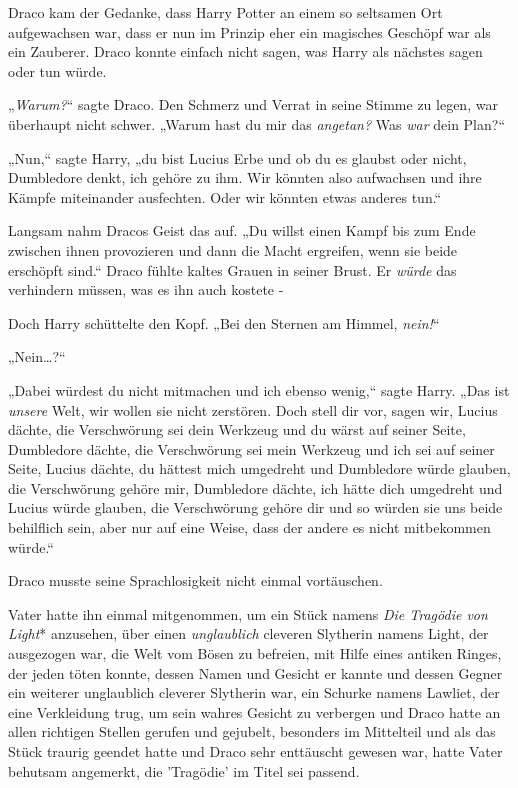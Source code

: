 {Draco kam der Gedanke, dass Harry Potter an einem so seltsamen Ort aufgewachsen war, dass er nun im Prinzip eher ein magisches Geschöpf war als ein Zauberer. Draco konnte einfach nicht sagen, was Harry als nächstes sagen oder tun würde.

„\emph{Warum?}“ sagte Draco. Den Schmerz und Verrat in seine Stimme zu legen, war überhaupt nicht schwer. „Warum hast du mir das \emph{angetan?} Was \emph{war} dein Plan?“

„Nun,“ sagte Harry, „du bist Lucius Erbe und ob du es glaubst oder nicht, Dumbledore denkt, ich gehöre zu ihm. Wir könnten also aufwachsen und ihre Kämpfe miteinander ausfechten. Oder wir könnten etwas anderes tun.“

Langsam nahm Dracos Geist das auf. „Du willst einen Kampf bis zum Ende zwischen ihnen provozieren und dann die Macht ergreifen, wenn sie beide erschöpft sind.“ Draco fühlte kaltes Grauen in seiner Brust. Er \emph{würde} das verhindern müssen, was es ihn auch kostete -

Doch Harry schüttelte den Kopf. „Bei den Sternen am Himmel, \emph{nein!}“

„Nein…?“

„Dabei würdest du nicht mitmachen und ich ebenso wenig,“ sagte Harry. „Das ist \emph{unsere} Welt, wir wollen sie nicht zerstören. Doch stell dir vor, sagen wir, Lucius dächte, die Verschwörung sei dein Werkzeug und du wärst auf seiner Seite, Dumbledore dächte, die Verschwörung sei mein Werkzeug und ich sei auf seiner Seite, Lucius dächte, du hättest mich umgedreht und Dumbledore würde glauben, die Verschwörung gehöre mir, Dumbledore dächte, ich hätte dich umgedreht und Lucius würde glauben, die Verschwörung gehöre dir und so würden sie uns beide behilflich sein, aber nur auf eine Weise, dass der andere es nicht mitbekommen würde.“

Draco musste seine Sprachlosigkeit nicht einmal vortäuschen.

Vater hatte ihn einmal mitgenommen, um ein Stück namens \emph{Die Tragödie von Light}* anzusehen, über einen \emph{unglaublich} cleveren Slytherin namens Light, der ausgezogen war, die Welt vom Bösen zu befreien, mit Hilfe eines antiken Ringes, der jeden töten konnte, dessen Namen und Gesicht er kannte und dessen Gegner ein weiterer unglaublich cleverer Slytherin war, ein Schurke namens Lawliet, der eine Verkleidung trug, um sein wahres Gesicht zu verbergen und Draco hatte an allen richtigen Stellen gerufen und gejubelt, besonders im Mittelteil und als das Stück traurig geendet hatte und Draco sehr enttäuscht gewesen war, hatte Vater behutsam angemerkt, die 'Tragödie' im Titel sei passend.

}
